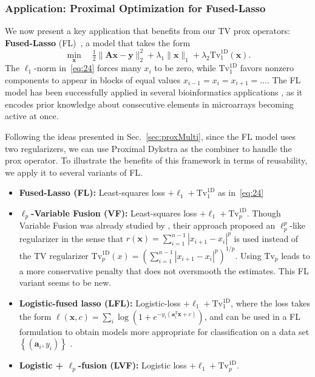 \documentclass[twoside,11pt]{article}
\newcommand{\va}{\bm{a}}       \newcommand{\vah}{\hat{\bm{a}}}        \newcommand{\ah}{\hat{a}}    \newcommand{\vat}{\tilde{\bm{a}}}       \newcommand{\at}{\tilde{a}}
\newcommand{\vx}{\bm{x}}       \newcommand{\vxh}{\hat{\bm{x}}}        \newcommand{\xh}{\hat{x}}    \newcommand{\vxt}{\tilde{\bm{x}}}       \newcommand{\xt}{\tilde{x}}
\newcommand{\vy}{\bm{y}}       \newcommand{\vyh}{\hat{\bm{y}}}        \newcommand{\yh}{\hat{y}}    \newcommand{\vyt}{\tilde{\bm{y}}}       \newcommand{\yt}{\tilde{y}}
\newcommand{\ma}{\bm{A}}
\newcommand{\mynorm}[2]{\| {#1} \|_{#2}}
\newcommand{\norm}[2]{\mynorm{#1}{#2}}
\newcommand{\enorm}[1]{\mynorm{#1}{2}}
\newcommand{\half}{\tfrac{1}{2}}
\newcommand{\tvell}{\text{Tv}}
\newcommand{\oned}{\text{1D}}
\numberwithin{equation}{section}
\numberwithin{theorem}{section}
\begin{document}
\subsubsection{Application: Proximal Optimization for Fused-Lasso}
\label{sec:FLasso}
We now present a key application that benefits from our TV prox operators:  \textbf{Fused-Lasso} (FL)~\citep{fl}, a model that takes the form
\begin{equation}
  \label{eq:24}
 \min_{\vx} \quad \half \enorm{\ma \vx - \vy}^2 + \lambda_1 \norm{\vx}{1} + \lambda_2 \tvell_1^{\oned}(\vx).
\end{equation}
 The $\ell_1$-norm in~\eqref{eq:24} forces many $x_i$ to be zero, while $\tvell_1^{\oned}$ favors nonzero components to appear in blocks of equal values $x_{i-1} = x_i = x_{i+1} = \ldots$. The FL model has been successfully applied in several bioinformatics applications \citep{cgh,cghsvm,frHaHoTi07}, as it encodes prior knowledge about consecutive elements in microarrays becoming active at once.

Following the ideas presented in Sec.~\ref{sec:proxMulti}, since the FL model uses two regularizers, we can use Proximal Dykstra as the combiner to handle the prox operator. To illustrate the benefits of this framework in terms of reusability, we apply it to several variants of FL.
\begin{itemize}
  \setlength{\itemsep}{0pt}
\item \textbf{Fused-Lasso (FL):} Least-squares loss $ + \ell_1 + \tvell_1^{\oned}$ as in~\eqref{eq:24}

\item \textbf{$\ell_p$-Variable Fusion (VF):} Least-squares loss  $ + \ell_1 + \tvell_p^{\oned}$. Though Variable Fusion was already studied by \citet{land}, their approach proposed an $\ell_p^p$-like regularizer in the sense that $r(\vx) = \sum_{i=1}^{n-1} |x_{i+1}-x_i|^p$ is used instead of the TV regularizer $\tvell_p^{\oned}(x) = \left( \sum_{i=1}^{n-1} |x_{i+1}-x_i|^p \right)^{1/p}$. Using $\tvell_p$ leads to a more conservative penalty that does not oversmooth the estimates. This FL variant seems to be new.

\item \textbf{Logistic-fused lasso (LFL):} Logistic-loss $ + \ell_1 + \tvell_1^{\oned}$, where the loss takes the form  $\ell(\vx,c) = \sum_i \log \left( 1 + e^{-y_i (\va_i^T\vx + c)} \right)$, and can be used in a FL formulation to obtain models more appropriate for classification on a data set $\left\lbrace (\va_i,y_i) \right\rbrace$ \citep{kolar}.

\item \textbf{Logistic + $\ell_p$-fusion (LVF):} Logistic loss $ + \ell_1 + \tvell_p^{\oned}$.
\end{itemize}
\end{document}
